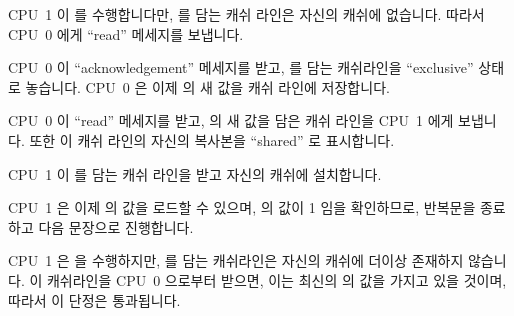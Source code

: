 \begin{sequence}
\item	CPU~1 이  를 수행합니다만,  를 담는
	캐쉬 라인은 자신의 캐쉬에 없습니다.
	따라서 CPU~0 에게 ``read'' 메세지를 보냅니다.
\item	CPU~0 이 ``acknowledgement'' 메세지를 받고,  를 담는 캐쉬라인을
	``exclusive'' 상태로 놓습니다.
	CPU~0 은 이제  의 새 값을 캐쉬 라인에 저장합니다.
\item	CPU~0 이 ``read'' 메세지를 받고,  의 새 값을 담은 캐쉬 라인을
	CPU~1 에게 보냅니다.
	또한 이 캐쉬 라인의 자신의 복사본을 ``shared'' 로 표시합니다.
	\label{seq:app:whymb:Store buffers: All copies shared}
\item	CPU~1 이  를 담는 캐쉬 라인을 받고 자신의 캐쉬에 설치합니다.
\item	CPU~1 은 이제  의 값을 로드할 수 있으며,  의 값이 1 임을
	확인하므로,  반복문을 종료하고 다음 문장으로 진행합니다.
\item	CPU~1 은  을 수행하지만,  를 담는 캐쉬라인은
	자신의 캐쉬에 더이상 존재하지 않습니다.
	이 캐쉬라인을 CPU~0 으로부터 받으면, 이는 최신의  의 값을 가지고
	있을 것이며, 따라서 이 단정은 통과됩니다.

\iffalse

\item	CPU~1 executes \co{while (b == 0) continue}, but the cache line
	containing \qco{b} is not in its cache.
	It therefore transmits a ``read'' message to CPU~0.
\item	CPU~0 receives the ``acknowledgement'' message, and puts
	the cache line containing \qco{b} into the ``exclusive'' state.
	CPU~0 now stores the new value of \qco{b} into the cache line.
\item	CPU~0 receives the ``read'' message, and transmits the
	cache line containing the new value of \qco{b}
	to CPU~1.
	It also marks its own copy of this cache line as ``shared''.%
	\label{seq:app:whymb:Store buffers: All copies shared}
\item	CPU~1 receives the cache line containing \qco{b} and installs
	it in its cache.
\item	CPU~1 can now load the value of \qco{b},
	and since it finds that the value of \qco{b} is 1, it
	exits the \co{while} loop and proceeds
	to the next statement.
\item	CPU~1 executes the \co{assert(a == 1)}, but the cache line containing
	\qco{a} is no longer in its cache.
	Once it gets this cache from CPU~0, it will be
	working with the up-to-date value of \qco{a}, and the assertion
	therefore passes.

\fi

\end{sequence}

